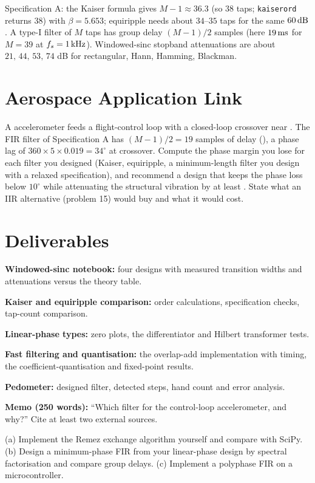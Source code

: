 \documentclass[11pt,a4paper]{article}
\begin{document}
\begin{checkpoint}
Specification A: the Kaiser formula gives $M-1\approx36.3$ (so $38$ taps; \texttt{kaiserord} returns $38$) with $\beta=5.653$; equiripple needs about $34$--$35$ taps for the same $\dB{60}$. A type-I filter of $M$ taps has group delay $(M-1)/2$ samples (here $\SI{19}{\milli\second}$ for $M=39$ at $f_s=\SI{1}{\kilo\hertz}$). Windowed-sinc stopband attenuations are about $21,\,44,\,53,\,74$ dB for rectangular, Hann, Hamming, Blackman.
\end{checkpoint}

\section*{Aerospace Application Link}
A  accelerometer feeds a flight-control loop with a closed-loop crossover near . The FIR filter of Specification A has $(M-1)/2=19$ samples of delay (), a phase lag of $360\times5\times0.019=34^\circ$ at crossover. Compute the phase margin you lose for each filter you designed (Kaiser, equiripple, a minimum-length filter you design with a relaxed specification), and recommend a design that keeps the phase loss below $10^\circ$ while attenuating the  structural vibration by at least . State what an IIR alternative (problem 15) would buy and what it would cost.

\section*{Deliverables}
\begin{delivs}
  \item[D1] \textbf{Windowed-sinc notebook:} four designs with measured transition widths and attenuations versus the theory table.
  \item[D2] \textbf{Kaiser and equiripple comparison:} order calculations, specification checks, tap-count comparison.
  \item[D3] \textbf{Linear-phase types:} zero plots, the differentiator and Hilbert transformer tests.
  \item[D4] \textbf{Fast filtering and quantisation:} the overlap-add implementation with timing, the coefficient-quantisation and fixed-point results.
  \item[D5] \textbf{Pedometer:} designed filter, detected steps, hand count and error analysis.
  \item[D6] \textbf{Memo (250 words):} ``Which filter for the control-loop accelerometer, and why?'' Cite at least two external sources.
  \item[Bonus] (a) Implement the Remez exchange algorithm yourself and compare with SciPy. (b) Design a minimum-phase FIR from your linear-phase design by spectral factorisation and compare group delays. (c) Implement a polyphase FIR on a microcontroller.
\end{delivs}
\end{document}

